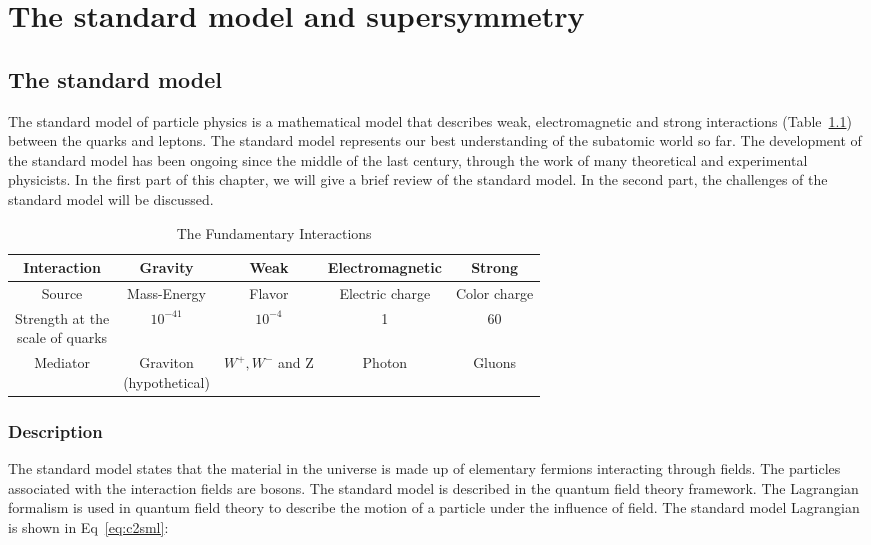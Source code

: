 \chapter{The standard model and supersymmetry}
\clearpage
\section{The standard model}
The standard model of particle physics is a mathematical model that describes weak, electromagnetic and strong interactions (Table~\ref{tab:c24ei}) between the quarks and leptons. The standard model represents our best understanding of the subatomic world so far. The development of the standard model has been ongoing since the middle of the last century, through the work of many theoretical and experimental physicists. In the first part of this chapter, we will give a brief review of the standard model. In the second part, the challenges of the standard model will be discussed. 

\begin{table}[htbp]
\fontsize{10 pt}{1.2 em}
\selectfont
\begin{centering}
\caption{\label{tab:c24ei} The Fundamentary Interactions}
\hspace*{-4ex}
\begin{tabular}{|c|c|c|c|c|}
\hline
Interaction                                      & Gravity & Weak & Electromagnetic & Strong \\
\hline
Source                                           & Mass-Energy & Flavor & Electric charge & Color charge \\
\hline
\specialcell{Strength at the \\ scale of quarks} & $10^{-41}$ & $10^{-4}$ & 1 & 60 \\
\hline
Mediator                                         & \specialcell{Graviton\\(hypothetical)} & $W^{+},W^{-}$ and Z & Photon & Gluons \\
\hline
\end{tabular}
\par\end{centering}
\end{table}

\clearpage
\subsection{Description}

The standard model states that the material in the universe is made up of elementary fermions interacting through fields. The particles associated with the interaction fields are bosons. The standard model is described in the quantum field theory framework. The Lagrangian formalism is used in quantum field theory to describe the motion of a particle under the influence of field. The standard model Lagrangian is shown in Eq~\ref{eq:c2sml}: 

